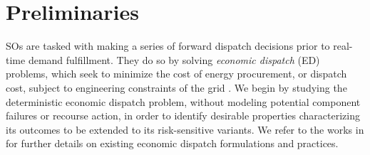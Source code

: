 \section{Preliminaries}
\label{sec:ED}

SOs are tasked with making a series of forward dispatch decisions prior to real-time demand fulfillment. 
They do so by solving \emph{economic dispatch} (ED) problems, which seek to minimize the cost of energy procurement, or dispatch cost, subject to engineering constraints of the grid \cite{varaiya2010smart}. We begin by studying the deterministic economic dispatch problem, without modeling potential component failures or recourse action, in order to identify desirable properties characterizing its outcomes to be extended to its risk-sensitive variants. We refer to the works in \cite{varaiya2010smart,ma2009security,rajagopal2013risk} for further details on existing economic dispatch formulations and practices. 

